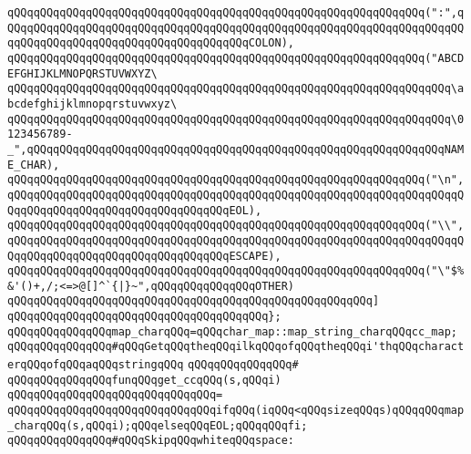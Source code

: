 \verb|qQQqqQQqqQQqqQQqqQQqqQQqqQQqqQQqqQQqqQQqqQQqqQQqqQQqqQQqqQQqqQQq(":",qQQqqQQqqQQqqQQqqQQqqQQqqQQqqQQqqQQqqQQqqQQqqQQqqQQqqQQqqQQqqQQqqQQqqQQqqQQqqQQqqQQqqQQqqQQqqQQqqQQqqQQqqQQqCOLON),|\newline
\verb|qQQqqQQqqQQqqQQqqQQqqQQqqQQqqQQqqQQqqQQqqQQqqQQqqQQqqQQqqQQqqQQq("ABCDEFGHIJKLMNOPQRSTUVWXYZ\|\newline
\verb|qQQqqQQqqQQqqQQqqQQqqQQqqQQqqQQqqQQqqQQqqQQqqQQqqQQqqQQqqQQqqQQqqQQq\abcdefghijklmnopqrstuvwxyz\|\newline
\verb|qQQqqQQqqQQqqQQqqQQqqQQqqQQqqQQqqQQqqQQqqQQqqQQqqQQqqQQqqQQqqQQqqQQq\0123456789-_",qQQqqQQqqQQqqQQqqQQqqQQqqQQqqQQqqQQqqQQqqQQqqQQqqQQqqQQqqQQqqQQqNAME_CHAR),|\newline
\verb|qQQqqQQqqQQqqQQqqQQqqQQqqQQqqQQqqQQqqQQqqQQqqQQqqQQqqQQqqQQqqQQq("\n",qQQqqQQqqQQqqQQqqQQqqQQqqQQqqQQqqQQqqQQqqQQqqQQqqQQqqQQqqQQqqQQqqQQqqQQqqQQqqQQqqQQqqQQqqQQqqQQqqQQqqQQqEOL),|\newline
\verb|qQQqqQQqqQQqqQQqqQQqqQQqqQQqqQQqqQQqqQQqqQQqqQQqqQQqqQQqqQQqqQQq("\\",qQQqqQQqqQQqqQQqqQQqqQQqqQQqqQQqqQQqqQQqqQQqqQQqqQQqqQQqqQQqqQQqqQQqqQQqqQQqqQQqqQQqqQQqqQQqqQQqqQQqqQQqESCAPE),|\newline
\verb|qQQqqQQqqQQqqQQqqQQqqQQqqQQqqQQqqQQqqQQqqQQqqQQqqQQqqQQqqQQqqQQq("\"$%&'()+,/;<=>@[]^`{|\verb#|}~",qQQqqQQqqQQqqQQqOTHER)#\newline
\verb|qQQqqQQqqQQqqQQqqQQqqQQqqQQqqQQqqQQqqQQqqQQqqQQqqQQqqQQq]|\newline
\verb|qQQqqQQqqQQqqQQqqQQqqQQqqQQqqQQqqQQqqQQq};|\newline
\newline
\verb|qQQqqQQqqQQqqQQqmap_charqQQq=qQQqchar_map::map_string_charqQQqcc_map;|\newline
\newline
\verb|qQQqqQQqqQQqqQQq#qQQqGetqQQqtheqQQqilkqQQqofqQQqtheqQQqi'thqQQqcharacterqQQqofqQQqaqQQqstringqQQq|\newline
\verb|qQQqqQQqqQQqqQQq#|\newline
\verb|qQQqqQQqqQQqqQQqfunqQQqget_ccqQQq(s,qQQqi)|\newline
\verb|qQQqqQQqqQQqqQQqqQQqqQQqqQQqqQQq=|\newline
\verb|qQQqqQQqqQQqqQQqqQQqqQQqqQQqqQQqifqQQq(iqQQq<qQQqsizeqQQqs)qQQqqQQqmap_charqQQq(s,qQQqi);qQQqelseqQQqEOL;qQQqqQQqfi;|\newline
\newline
\verb|qQQqqQQqqQQqqQQq#qQQqSkipqQQqwhiteqQQqspace:|\newline
